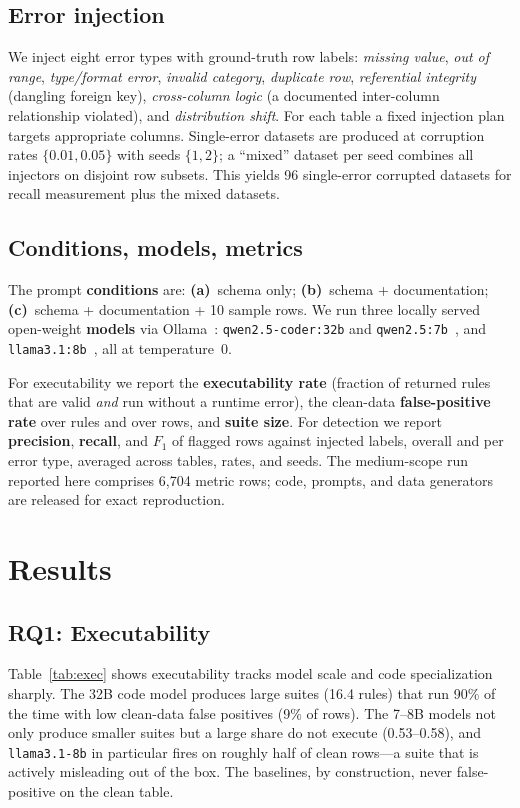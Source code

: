 \documentclass[10pt,twocolumn]{article}
\begin{document}
\subsection{Error injection}
We inject eight error types with ground-truth row labels: \emph{missing value},
\emph{out of range}, \emph{type/format error}, \emph{invalid category},
\emph{duplicate row}, \emph{referential integrity} (dangling foreign key),
\emph{cross-column logic} (a documented inter-column relationship violated), and
\emph{distribution shift}. For each table a fixed injection plan targets
appropriate columns. Single-error datasets are produced at corruption rates
$\{0.01, 0.05\}$ with seeds $\{1,2\}$; a ``mixed'' dataset per seed combines all
injectors on disjoint row subsets. This yields 96 single-error corrupted datasets
for recall measurement plus the mixed datasets.

\subsection{Conditions, models, metrics}
The prompt \textbf{conditions} are: \textbf{(a)}~schema only; \textbf{(b)}~schema
+ documentation; \textbf{(c)}~schema + documentation + 10 sample rows. We run three
locally served open-weight \textbf{models} via Ollama~\cite{ollama}:
\texttt{qwen2.5-coder:32b} and \texttt{qwen2.5:7b}~\cite{qwen25}, and
\texttt{llama3.1:8b}~\cite{llama3}, all at temperature~0.

For executability we report the \textbf{executability rate} (fraction of returned
rules that are valid \emph{and} run without a runtime error), the clean-data
\textbf{false-positive rate} over rules and over rows, and \textbf{suite size}.
For detection we report \textbf{precision}, \textbf{recall}, and \textbf{$F_1$}
of flagged rows against injected labels, overall and per error type, averaged
across tables, rates, and seeds. The medium-scope run reported here comprises
6{,}704 metric rows; code, prompts, and data generators are released for exact
reproduction.

\section{Results}\label{sec:results}

\subsection{RQ1: Executability}
Table~\ref{tab:exec} shows executability tracks model scale and code
specialization sharply. The 32B code model produces large suites (16.4 rules)
that run 90\% of the time with low clean-data false positives (9\% of rows). The
7--8B models not only produce smaller suites but a large share do not execute
(0.53--0.58), and \texttt{llama3.1-8b} in particular fires on roughly half of
clean rows---a suite that is actively misleading out of the box. The baselines,
by construction, never false-positive on the clean table.
\end{document}
